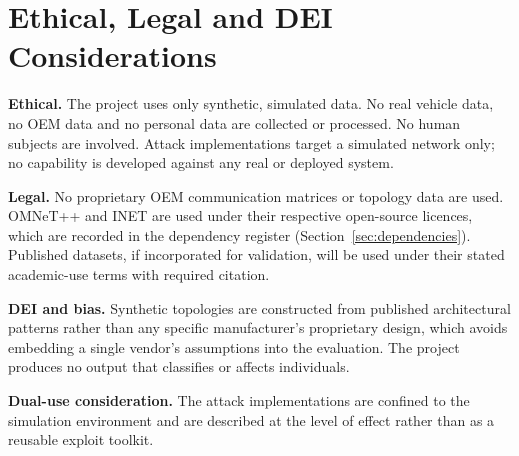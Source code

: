 \section{Ethical, Legal and DEI Considerations}

\textbf{Ethical.} The project uses only synthetic, simulated data. No real vehicle
data, no OEM data and no personal data are collected or processed. No human subjects
are involved. Attack implementations target a simulated network only; no capability
is developed against any real or deployed system.

\textbf{Legal.} No proprietary OEM communication matrices or topology data are used.
OMNeT++ and INET are used under their respective open-source licences, which are
recorded in the dependency register (Section~\ref{sec:dependencies}). Published datasets, if
incorporated for validation, will be used under their stated academic-use terms with
required citation.

\textbf{DEI and bias.} Synthetic topologies are constructed from published
architectural patterns rather than any specific manufacturer's proprietary design,
which avoids embedding a single vendor's assumptions into the evaluation. The
project produces no output that classifies or affects individuals.

\textbf{Dual-use consideration.} The attack implementations are confined to the
simulation environment and are described at the level of effect rather than as a
reusable exploit toolkit.

